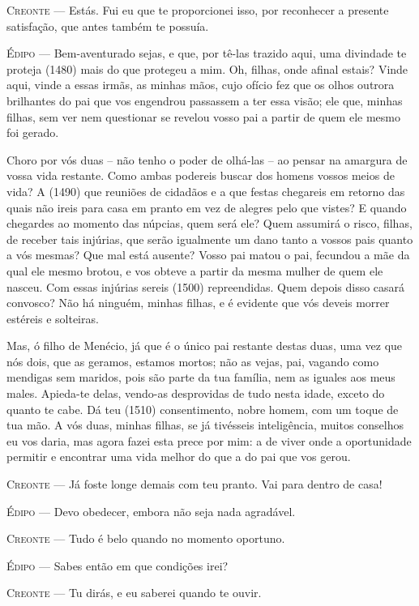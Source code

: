 \textsc{Creonte} --- Estás. Fui eu que te proporcionei isso, por reconhecer a presente
satisfação, que antes também te possuía.

\textsc{Édipo} --- Bem-aventurado sejas, e que, por tê-las trazido aqui, uma divindade te
proteja (1480) mais do que protegeu a mim. Oh, filhas, onde afinal
estais? Vinde aqui, vinde a essas irmãs, as minhas mãos, cujo ofício fez
que os olhos outrora brilhantes do pai que vos engendrou passassem a ter
essa visão; ele que, minhas filhas, sem ver nem questionar se revelou
vosso pai a partir de quem ele mesmo foi gerado.

Choro por vós duas -- não tenho o poder de olhá-las -- ao pensar na
amargura de vossa vida restante. Como ambas podereis buscar dos homens
vossos meios de vida? A (1490) que reuniões de cidadãos e a que festas
chegareis em retorno das quais não ireis para casa em pranto em vez de
alegres pelo que vistes? E quando chegardes ao momento das núpcias, quem
será ele? Quem assumirá o risco, filhas, de receber tais injúrias, que
serão igualmente um dano tanto a vossos pais quanto a vós mesmas? Que
mal está ausente? Vosso pai matou o pai, fecundou a mãe da qual ele
mesmo brotou, e vos obteve a partir da mesma mulher de quem ele nasceu.
Com essas injúrias sereis (1500) repreendidas. Quem depois disso casará
convosco? Não há ninguém, minhas filhas, e é evidente que vós deveis
morrer estéreis e solteiras.

Mas, ó filho de Menécio, já que é o único pai restante destas duas, uma
vez que nós dois, que as geramos, estamos mortos; não as vejas, pai,
vagando como mendigas sem maridos, pois são parte da tua família, nem as
iguales aos meus males. Apieda-te delas, vendo-as desprovidas de tudo
nesta idade, exceto do quanto te cabe. Dá teu (1510) consentimento,
nobre homem, com um toque de tua mão. A vós duas, minhas filhas, se já
tivésseis inteligência, muitos conselhos eu vos daria, mas agora fazei
esta prece por mim: a de viver onde a oportunidade permitir e encontrar
uma vida melhor do que a do pai que vos gerou.

\textsc{Creonte} --- Já foste longe demais com teu pranto. Vai para dentro de casa!

\textsc{Édipo} --- Devo obedecer, embora não seja nada agradável.

\textsc{Creonte} --- Tudo é belo quando no momento oportuno.

\textsc{Édipo} --- Sabes então em que condições irei?

\textsc{Creonte} --- Tu dirás, e eu saberei quando te ouvir.

